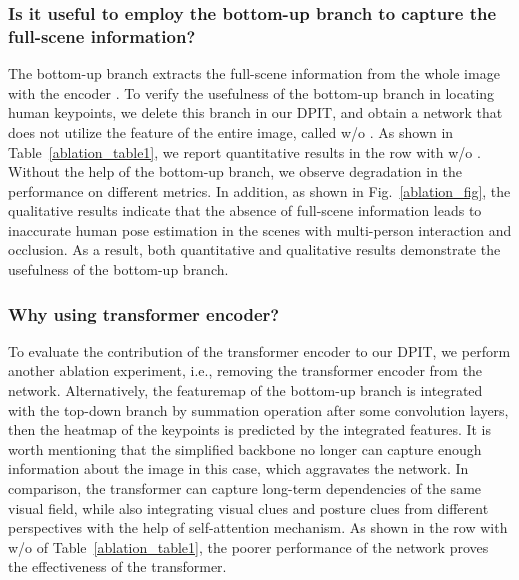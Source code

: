 \documentclass[runningheads]{llncs}
\begin{document}
\subsubsection{Is it useful to employ the bottom-up branch to capture the full-scene information?}
The bottom-up branch extracts the full-scene information from the whole image with the encoder . To verify the usefulness of the bottom-up branch in locating human keypoints, we delete this branch in our DPIT, and obtain a network that does not utilize the feature of the entire image, called w/o . As shown in Table~\ref{ablation_table1}, we report quantitative results in the row with w/o . Without the help of the bottom-up branch, we observe degradation in the performance on different metrics. In addition, as shown in Fig.~\ref{ablation_fig}, the qualitative results indicate that the absence of full-scene information leads to inaccurate human pose estimation in the scenes with multi-person interaction and occlusion. As a result, both quantitative and qualitative results demonstrate the usefulness of the bottom-up branch.

\subsubsection{Why using transformer encoder?}
To evaluate the contribution of the transformer encoder to our DPIT, we perform another ablation experiment, i.e., removing the transformer encoder from the network. Alternatively, the featuremap of the bottom-up branch is integrated with the top-down branch by summation operation after some convolution layers, then the heatmap of the keypoints is predicted by the integrated features. It is worth mentioning that the simplified backbone no longer can capture enough information about the image in this case, which aggravates the network. In comparison, the transformer can capture long-term dependencies of the same visual field, while also integrating visual clues and posture clues from different perspectives with the help of self-attention mechanism. As shown in the row with w/o  of Table~\ref{ablation_table1}, the poorer performance of the network proves the effectiveness of the transformer.
\end{document}

